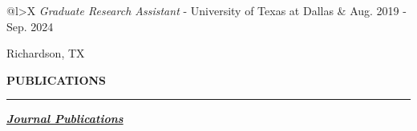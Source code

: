 \documentclass[12pt]{article}
\begin{document}
\begin{tabularx}{\linewidth}{{@{}l>{\raggedleft\arraybackslash}X}}
  \textit{Graduate Research Assistant} - University of Texas at Dallas     & Aug. 2019 - Sep. 2024 
    \end{tabularx}
    Richardson, TX
    \vspace{2em}


{\Large \textbf{PUBLICATIONS}}

\textcolor{gray}{\rule{\textwidth}{2pt}}

{\large \textit{\textbf{\ul{Journal Publications}}}}

\end{document}

